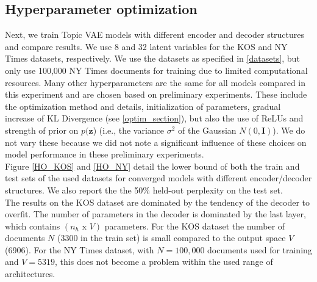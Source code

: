 \documentclass{report}
\begin{document}
	\subsection{Hyperparameter optimization}\label{HO_section}
	Next, we train Topic VAE models with different encoder and decoder structures and compare results. We use 8 and 32 latent variables for the KOS and NY Times datasets, respectively. We use the datasets as specified in \ref{datasets}, but only use 100,000 NY Times documents for training due to limited computational resources. Many other hyperparameters  are the same for all models compared in this experiment and are chosen based on preliminary experiments. These include the optimization method and details, initialization of parameters, gradual increase of KL Divergence (see \ref{optim_section}), but also the use of ReLUs and strength of prior on $p(\mathbf{z}$) (i.e., the variance $\sigma^2$ of the Gaussian $N(0,\mathbf{I})$). We do not vary these because we did not note a significant influence of these choices on model performance in these preliminary experiments. \\
	Figure \ref{HO_KOS} and \ref{HO_NY} detail the lower bound of both the train and test sets of the used datasets for converged models with different encoder/decoder structures. We also report the the 50\% held-out perplexity on the test set.\\
	The results on the KOS dataset are dominated by the tendency of the decoder to overfit. The number of parameters in the decoder is dominated by the last layer, which contains $(n_h \text{ x } V)$ parameters. For the KOS dataset the number of documents $N$ (3300 in the train set) is small compared to the output space $V$ (6906). For the NY Times dataset, with $N = 100,000$ documents used for training and $V = 5319$, this does not become a problem within the used range of architectures.  
		
\end{document}
